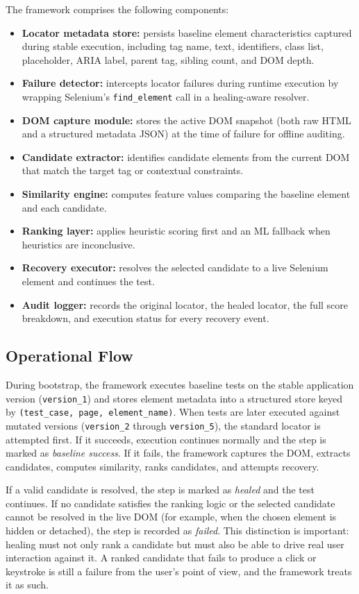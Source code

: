 \documentclass[conference]{IEEEtran}
\begin{document}
The framework comprises the following components:
\begin{itemize}[leftmargin=1.2em]
    \item \textbf{Locator metadata store:} persists baseline element characteristics captured during stable execution, including tag name, text, identifiers, class list, placeholder, ARIA label, parent tag, sibling count, and DOM depth.
    \item \textbf{Failure detector:} intercepts locator failures during runtime execution by wrapping Selenium's \texttt{find\_element} call in a healing-aware resolver.
    \item \textbf{DOM capture module:} stores the active DOM snapshot (both raw HTML and a structured metadata JSON) at the time of failure for offline auditing.
    \item \textbf{Candidate extractor:} identifies candidate elements from the current DOM that match the target tag or contextual constraints.
    \item \textbf{Similarity engine:} computes feature values comparing the baseline element and each candidate.
    \item \textbf{Ranking layer:} applies heuristic scoring first and an ML fallback when heuristics are inconclusive.
    \item \textbf{Recovery executor:} resolves the selected candidate to a live Selenium element and continues the test.
    \item \textbf{Audit logger:} records the original locator, the healed locator, the full score breakdown, and execution status for every recovery event.
\end{itemize}

\subsection{Operational Flow}
During bootstrap, the framework executes baseline tests on the stable application version (\texttt{version\_1}) and stores element metadata into a structured store keyed by \texttt{(test\_case, page, element\_name)}. When tests are later executed against mutated versions (\texttt{version\_2} through \texttt{version\_5}), the standard locator is attempted first. If it succeeds, execution continues normally and the step is marked as \emph{baseline success}. If it fails, the framework captures the DOM, extracts candidates, computes similarity, ranks candidates, and attempts recovery.

If a valid candidate is resolved, the step is marked as \emph{healed} and the test continues. If no candidate satisfies the ranking logic or the selected candidate cannot be resolved in the live DOM (for example, when the chosen element is hidden or detached), the step is recorded as \emph{failed}. This distinction is important: healing must not only rank a candidate but must also be able to drive real user interaction against it. A ranked candidate that fails to produce a click or keystroke is still a failure from the user's point of view, and the framework treats it as such.
\end{document}

